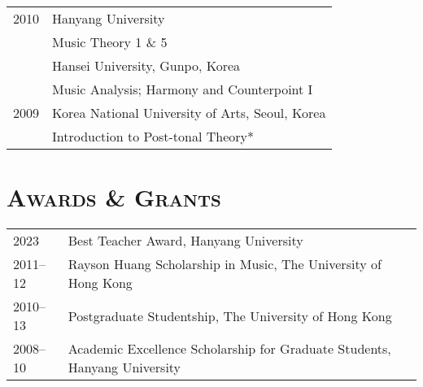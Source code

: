 \documentclass[a4paper,11pt,draft]{article}
\begin{document}
\begin{tabular}{p{2.5cm} l}
    2010 & Hanyang University\\
    & Music Theory 1 \& 5\\[1mm]
    
    & Hansei University, Gunpo, Korea\\
    & Music Analysis; Harmony and Counterpoint I\\[1mm]
    
    2009 & Korea National University of Arts, Seoul, Korea\\
    & Introduction to Post-tonal Theory*\\
  \end{tabular}
  
  \vspace{2.5mm}
  
  
  
  
  \section*{\textsc{Awards \& Grants}}
  
  \hspace*{-0.25cm}
  \begin{tabular}{p{2.5cm} l}
    
    2023 & Best Teacher Award, Hanyang University\\
    
    2011–12 & Rayson Huang Scholarship in Music, The University of Hong Kong\\
    
    2010–13 & Postgraduate Studentship, The University of Hong Kong\\
    
    2008–10 & Academic Excellence Scholarship for Graduate Students, Hanyang
    University
  \end{tabular}
  
\end{document}
